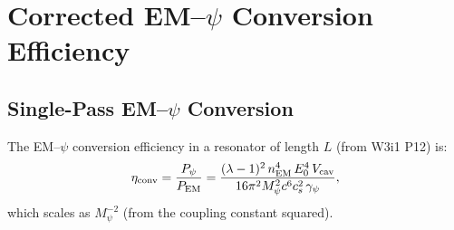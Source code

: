 \documentclass[aps,prd,twocolumn,superscriptaddress,nofootinbib]{revtex4-2}
\begin{document}
\section{Corrected EM--$\psi$ Conversion Efficiency}
\label{sec:conversion}

\subsection{Single-Pass EM--$\psi$ Conversion}

The EM--$\psi$ conversion efficiency in a resonator of length $L$
(from W3i1 P12) is:
\begin{equation}
\eta_{\rm conv} = \frac{P_\psi}{P_{\rm EM}}
= \frac{(\lambda-1)^2\,n_{\rm EM}^4\,E_0^4\,V_{\rm cav}}
{16\pi^2 M_\psi^2 c^6 c_s^2\,\gamma_\psi},
\label{eq:eta_conv}
\end{equation}
which scales as $M_\psi^{-2}$ (from the coupling constant squared).
\end{document}

